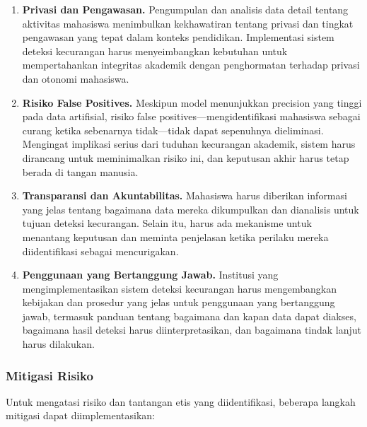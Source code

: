 \begin{enumerate}
    \item \textbf{Privasi dan Pengawasan.} Pengumpulan dan analisis data detail tentang aktivitas mahasiswa menimbulkan kekhawatiran tentang privasi dan tingkat pengawasan yang tepat dalam konteks pendidikan. Implementasi sistem deteksi kecurangan harus menyeimbangkan kebutuhan untuk mempertahankan integritas akademik dengan penghormatan terhadap privasi dan otonomi mahasiswa.

    \item \textbf{Risiko False Positives.} Meskipun model menunjukkan precision yang tinggi pada data artifisial, risiko false positives—mengidentifikasi mahasiswa sebagai curang ketika sebenarnya tidak—tidak dapat sepenuhnya dieliminasi. Mengingat implikasi serius dari tuduhan kecurangan akademik, sistem harus dirancang untuk meminimalkan risiko ini, dan keputusan akhir harus tetap berada di tangan manusia.

    \item \textbf{Transparansi dan Akuntabilitas.} Mahasiswa harus diberikan informasi yang jelas tentang bagaimana data mereka dikumpulkan dan dianalisis untuk tujuan deteksi kecurangan. Selain itu, harus ada mekanisme untuk menantang keputusan dan meminta penjelasan ketika perilaku mereka diidentifikasi sebagai mencurigakan.

    \item \textbf{Penggunaan yang Bertanggung Jawab.} Institusi yang mengimplementasikan sistem deteksi kecurangan harus mengembangkan kebijakan dan prosedur yang jelas untuk penggunaan yang bertanggung jawab, termasuk panduan tentang bagaimana dan kapan data dapat diakses, bagaimana hasil deteksi harus diinterpretasikan, dan bagaimana tindak lanjut harus dilakukan.
\end{enumerate}

\subsubsection{Mitigasi Risiko}

Untuk mengatasi risiko dan tantangan etis yang diidentifikasi, beberapa langkah mitigasi dapat diimplementasikan:

